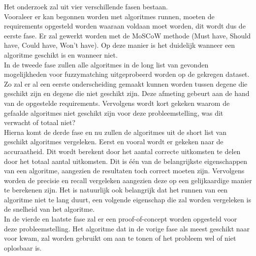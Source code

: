 Het onderzoek zal uit vier verschillende fasen bestaan.
\\\indent
Vooraleer er kan begonnen worden met algoritmes runnen, moeten de requirements opgesteld worden waaraan voldaan moet worden, dit wordt dus de eerste fase. Er zal gewerkt worden met de MoSCoW methode (Must have, Should have, Could have, Won't have). Op deze manier is het duidelijk wanneer een algoritme geschikt is en wanneer niet.
\\\indent
In de tweede fase zullen alle algoritmes in de long list van gevonden mogelijkheden voor fuzzymatching uitgeprobeerd worden op de gekregen dataset. Zo zal er al een eerste onderscheiding gemaakt kunnen worden tussen degene die geschikt zijn en degene die niet geschikt zijn. Deze afmeting gebeurt aan de hand van de opgestelde requirements. Vervolgens wordt kort gekeken waarom de gefaalde algoritmes niet geschikt zijn voor deze probleemstelling, was dit verwacht of totaal niet?
\\\indent
Hierna komt de derde fase en nu zullen de algoritmes uit de short list van geschikt algoritmes vergeleken. Eerst en vooral wordt er gekeken naar de accuraatheid. Dit wordt berekent door het aantal correcte uitkomsten te delen door het totaal aantal uitkomsten. Dit is één van de belangrijkste eigenschappen van een algoritme, aangezien de resultaten toch correct moeten zijn. Vervolgens worden de precisie en recall vergeleken aangezien deze op een gelijkaardige manier te berekenen zijn. Het is natuurlijk ook belangrijk dat het runnen van een algoritme niet te lang duurt, een volgende eigenschap die zal worden vergeleken is de snelheid van het algoritme.
\\\indent
In de vierde en laatste fase zal er een proof-of-concept worden opgesteld voor deze probleemstelling. Het algoritme dat in de vorige fase als meest geschikt naar voor kwam, zal worden gebruikt om aan te tonen of het probleem wel of niet oplosbaar is.







